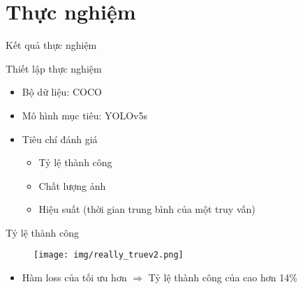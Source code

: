 \documentclass[aspectratio=169, 12pt]{beamer}
\begin{document}
\section{Thực nghiệm}




    

\begin{frame}
\vfill
\begin{center}
\Large{Kết quả thực nghiệm}
\end{center}
\vfill
\end{frame}

	
\begin{frame}{Thiết lập thực nghiệm}
    \begin{itemize}
        \item Bộ dữ liệu: COCO
        \item Mô hình mục tiêu: YOLOv5s
        \item Tiêu chí đánh giá
            \begin{itemize}
                \item Tỷ lệ thành công
                \item Chất lượng ảnh
                \item Hiệu suất (thời gian trung bình của một truy vấn)
            \end{itemize}
    \end{itemize}
\end{frame}


\begin{frame}{Tỷ lệ thành công}    

\begin{figure}[!hbpt]
    \centering
    \texttt{[image: img/really\_truev2.png]}
    \label{fig:sr}
\end{figure}

\begin{itemize}
    \item Hàm loss của \proposedMethod tối ưu hơn \prfa $\Rightarrow$  Tỷ lệ thành công của \propose cao hơn 14\%
\end{itemize}


\end{frame}
\end{document}
